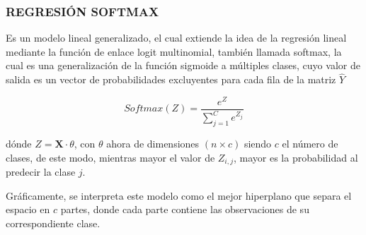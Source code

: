         \subsubsection{REGRESIÓN SOFTMAX}
        Es un modelo lineal generalizado, el cual extiende la idea de la regresión lineal mediante la función de enlace logit multinomial, también llamada softmax, la cual es una generalización de la función sigmoide a múltiples clases, cuyo valor de salida es un vector de probabilidades excluyentes para cada fila de la matriz $\hat{Y}$
        
        \begin{equation}
            Softmax(Z) = \frac{e^{Z}}{\sum_{j=1}^{C} e^{Z_j}}
        \end{equation}
        
        \noindent dónde $Z = \mathbf{X}\cdot\theta$, con $\theta$ ahora de dimensiones $(n \times c)$ siendo $c$ el número de clases, de este modo, mientras mayor el valor de $Z_{i,j}$, mayor es la probabilidad al predecir la clase $j$. \citep{Goodfellow-et-al-2016}
        
        Gráficamente, se interpreta este modelo como el mejor hiperplano que separa el espacio en $c$ partes, donde cada parte contiene las observaciones de su correspondiente clase.
        
